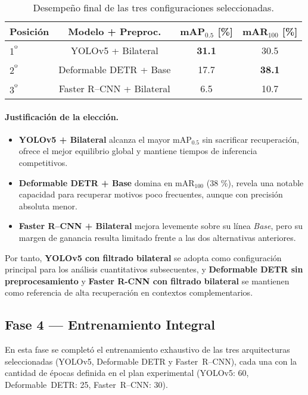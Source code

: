 \begin{table}[!ht]
  \centering
  \begin{tabular}{lccc}
    \hline
    \textbf{Posición} & \textbf{Modelo + Preproc.} & \textbf{mAP\(_{0.5}\) [\%]} & \textbf{mAR\(_{100}\) [\%]}\\
    \hline
    1\textsuperscript{º} & YOLOv5 + Bilateral           & \textbf{31.1} & 30.5\\
    2\textsuperscript{º} & Deformable DETR + Base       & 17.7 & \textbf{38.1}\\
    3\textsuperscript{º} & Faster R–CNN + Bilateral     & 6.5  & 10.7\\
    \hline
  \end{tabular}
  \caption[Ranking de configuraciones óptimas]{Desempeño final de las tres configuraciones seleccionadas.}
  \label{tab:fase3_ranking}
\end{table}

\paragraph{Justificación de la elección.}
\begin{itemize}
  \item \textbf{YOLOv5 + Bilateral} alcanza el mayor mAP\(_{0.5}\) sin sacrificar recuperación, ofrece el mejor equilibrio global y mantiene tiempos de inferencia competitivos.
  \item \textbf{Deformable DETR + Base} domina en mAR\(_{100}\) (38 \%), revela una notable capacidad para recuperar motivos poco frecuentes, aunque con precisión absoluta menor.
  \item \textbf{Faster R–CNN + Bilateral} mejora levemente sobre su línea \textit{Base}, pero su margen de ganancia resulta limitado frente a las dos alternativas anteriores.
\end{itemize}

Por tanto, \textbf{YOLOv5 con filtrado bilateral} se adopta como configuración principal para los análisis cuantitativos subsecuentes, y \textbf{Deformable DETR sin preprocesamiento} y \textbf{Faster R-CNN con filtrado bilateral} se mantienen como referencia de alta recuperación en contextos complementarios.

\subsection{Fase 4 — Entrenamiento Integral}
\label{ssec:fase4_integral}

En esta fase se completó el entrenamiento exhaustivo de las tres arquitecturas seleccionadas
(YOLOv5, Deformable DETR y Faster~R–CNN), cada una con la cantidad de épocas definida en el plan experimental
(YOLOv5: 60, Deformable~DETR: 25, Faster~R–CNN: 30).

